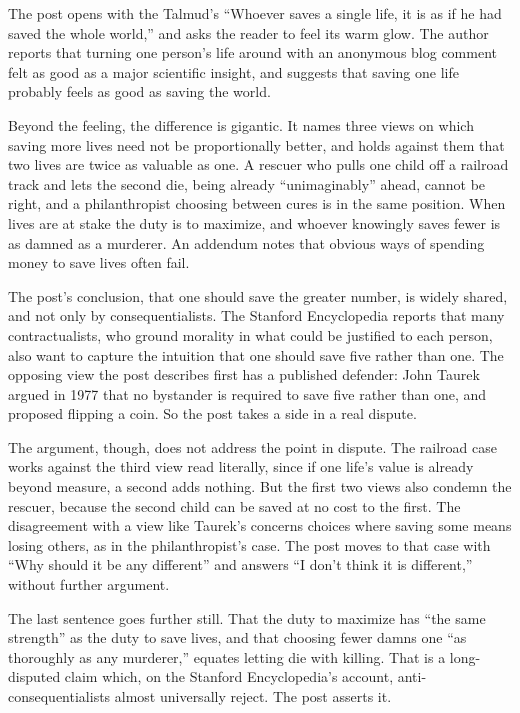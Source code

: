 \begin{afterword}
\summaryhead

The post opens with the Talmud's ``Whoever saves a single life, it is as if he had saved the whole world,'' and asks the reader to feel its warm glow. The author reports that turning one person's life around with an anonymous blog comment felt as good as a major scientific insight, and suggests that saving one life probably feels as good as saving the world.

Beyond the feeling, the difference is gigantic. It names three views on which saving more lives need not be proportionally better, and holds against them that two lives are twice as valuable as one. A rescuer who pulls one child off a railroad track and lets the second die, being already ``unimaginably'' ahead, cannot be right, and a philanthropist choosing between cures is in the same position. When lives are at stake the duty is to maximize, and whoever knowingly saves fewer is as damned as a murderer. An addendum notes that obvious ways of spending money to save lives often fail.

\responsehead

The post's conclusion, that one should save the greater number, is widely shared, and not only by consequentialists. The Stanford Encyclopedia reports that many contractualists, who ground morality in what could be justified to each person, also want to capture the intuition that one should save five rather than one. The opposing view the post describes first has a published defender: John Taurek argued in 1977 that no bystander is required to save five rather than one, and proposed flipping a coin. So the post takes a side in a real dispute.

The argument, though, does not address the point in dispute. The railroad case works against the third view read literally, since if one life's value is already beyond measure, a second adds nothing. But the first two views also condemn the rescuer, because the second child can be saved at no cost to the first. The disagreement with a view like Taurek's concerns choices where saving some means losing others, as in the philanthropist's case. The post moves to that case with ``Why should it be any different'' and answers ``I don't think it is different,'' without further argument.

The last sentence goes further still. That the duty to maximize has ``the same strength'' as the duty to save lives, and that choosing fewer damns one ``as thoroughly as any murderer,'' equates letting die with killing. That is a long-disputed claim which, on the Stanford Encyclopedia's account, anti-consequentialists almost universally reject. The post asserts it.


\end{afterword}
